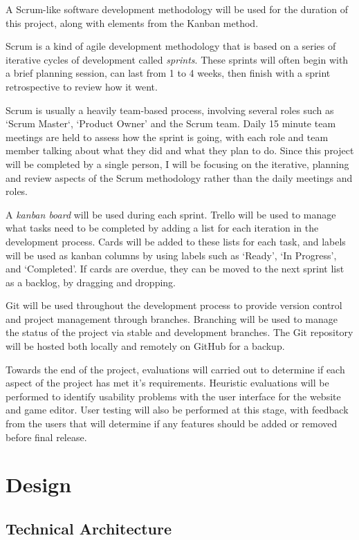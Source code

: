 \documentclass[a4paper, 12pt]{article}
\begin{document}
A Scrum-like software development methodology will be used for the duration of this project, along with elements from the Kanban method.

Scrum is a kind of agile development methodology that is based on a series of iterative cycles of development called \emph{sprints}. These sprints will often begin with a brief planning session, can last from 1 to 4 weeks, then finish with a sprint retrospective to review how it went.

Scrum is usually a heavily team-based process, involving several roles such as `Scrum Master`, `Product Owner' and the Scrum team. Daily 15 minute team meetings are held to assess how the sprint is going, with each role and team member talking about what they did and what they plan to do. Since this project will be completed by a single person, I will be focusing on the iterative, planning and review aspects of the Scrum methodology rather than the daily meetings and roles.

A \emph{kanban board} will be used during each sprint. Trello will be used to manage what tasks need to be completed by adding a list for each iteration in the development process. Cards will be added to these lists for each task, and labels will be used as kanban columns by using labels such as `Ready', `In Progress', and `Completed'. If cards are overdue, they can be moved to the next sprint list as a backlog, by dragging and dropping.

Git will be used throughout the development process to provide version control and project management through branches. Branching will be used to manage the status of the project via stable and development branches. The Git repository will be hosted both locally and remotely on GitHub for a backup.

Towards the end of the project, evaluations will carried out to determine if each aspect of the project has met it's requirements. Heuristic evaluations will be performed to identify usability problems with the user interface for the website and game editor. User testing will also be performed at this stage, with feedback from the users that will determine if any features should be added or removed before final release.

\section{Design}
\subsection{Technical Architecture}
\end{document}
